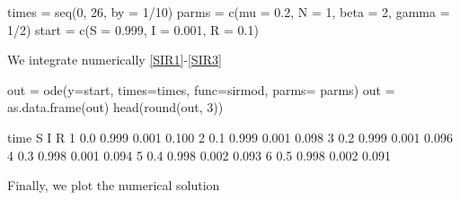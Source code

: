 \documentclass[12pt]{article}\usepackage[]{graphicx}\usepackage[]{color}
\begin{document}
\begin{Schunk}
\begin{Sinput}
times = seq(0, 26, by = 1/10)
parms = c(mu = 0.2, N = 1, beta = 2, gamma = 1/2)
start = c(S = 0.999, I = 0.001, R = 0.1)
\end{Sinput}
\end{Schunk}


We integrate numerically \eqref{SIR1}-\eqref{SIR3}

\begin{Schunk}
\begin{Sinput}
out = ode(y=start, times=times, func=sirmod, parms= parms)
out = as.data.frame(out) 
head(round(out, 3))
\end{Sinput}
\begin{Soutput}
  time     S     I     R
1  0.0 0.999 0.001 0.100
2  0.1 0.999 0.001 0.098
3  0.2 0.999 0.001 0.096
4  0.3 0.998 0.001 0.094
5  0.4 0.998 0.002 0.093
6  0.5 0.998 0.002 0.091
\end{Soutput}
\end{Schunk}

Finally, we plot the numerical solution
\end{document}
